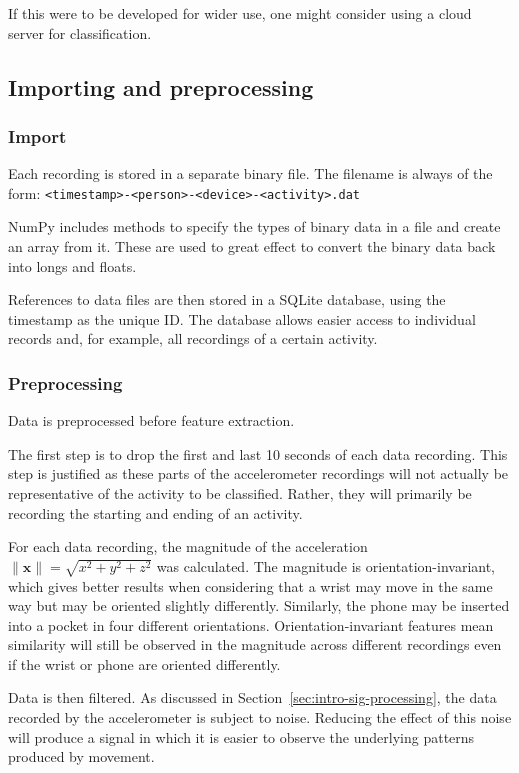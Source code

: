     If this were to be developed for wider use, one might consider using a cloud server for classification.
  
    \subsection{Importing and preprocessing}
      \label{sec:importing-and-preprocessing}
      \subsubsection{Import}
        Each recording is stored in a separate binary file. The filename is always of the form: \texttt{<timestamp>-<person>-<device>-<activity>.dat}
        
        NumPy includes methods to specify the types of binary data in a file and create an array from it. These are used to great effect to convert the binary data back into longs and floats.
        
        References to data files are then stored in a SQLite database, using the timestamp as the unique ID. The database allows easier access to individual records and, for example, all recordings of a certain activity.
      \subsubsection{Preprocessing}
        \label{sec:preprocessing}
        Data is preprocessed before feature extraction.
        
        The first step is to drop the first and last 10 seconds of each data recording. This step is justified as these parts of the accelerometer recordings will not actually be representative of the activity to be classified. Rather, they will primarily be recording the starting and ending of an activity.
        
        For each data recording, the magnitude of the acceleration $\|\mathbf{x}\| = \sqrt{x^2+y^2+z^2}$ was calculated. The magnitude is orientation-invariant, which gives better results when considering that a wrist may move in the same way but may be oriented slightly differently. Similarly, the phone may be inserted into a pocket in four different orientations. Orientation-invariant features mean similarity will still be observed in the magnitude across different recordings even if the wrist or phone are oriented differently.
        
        Data is then filtered. As discussed in Section~\ref{sec:intro-sig-processing}, the data recorded by the accelerometer is subject to noise. Reducing the effect of this noise will produce a signal in which it is easier to observe the underlying patterns produced by movement.
        
